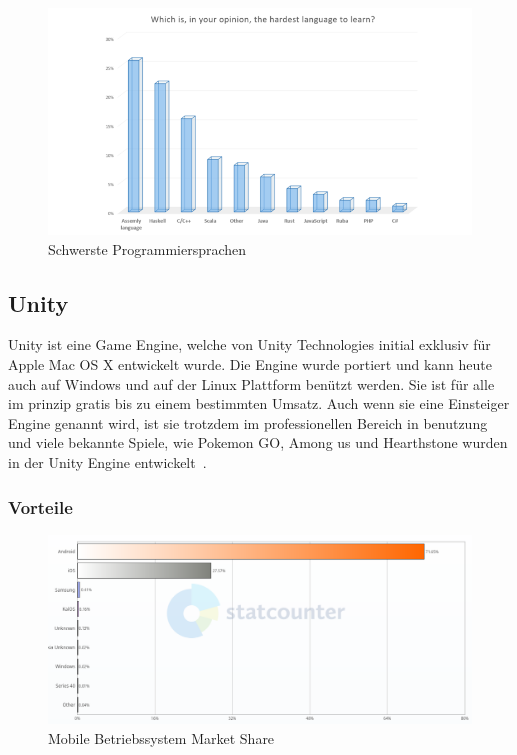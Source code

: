\begin{figure}
    \includegraphics[scale=0.4]{pics/programming_languages_hardest}
    \caption{Schwerste Programmiersprachen~\cite{JAXCENTER_2018}}
    \label{fig:hardest_programming_languages}
\end{figure}

\subsection{Unity}\label{subsec:unity}

Unity ist eine Game Engine, welche von Unity Technologies initial exklusiv für Apple Mac OS X entwickelt wurde.
Die Engine wurde portiert und kann heute auch auf Windows und auf der Linux Plattform benützt werden.
Sie ist für alle im prinzip gratis bis zu einem bestimmten Umsatz.
Auch wenn sie eine Einsteiger Engine genannt wird, ist sie trotzdem im professionellen Bereich in benutzung und viele bekannte Spiele, wie Pokemon GO, Among us und Hearthstone wurden in der Unity Engine entwickelt~\cite{Haas2014AHO,Unity_System_Specification,UNITY_PRICING_1,WIKIPEDIA_UNITY_GAME_LIST_2014}.

\subsubsection{Vorteile}\label{subsubsec:vorteile}

\begin{figure}
    \centering
    \includegraphics[scale=0.35]{pics/mobile_os_marketshare}
    \caption{Mobile Betriebssystem Market Share~\cite{StatCounter_Mobile_2021}}
    \label{fig:mobile-os-market-share}
\end{figure}

